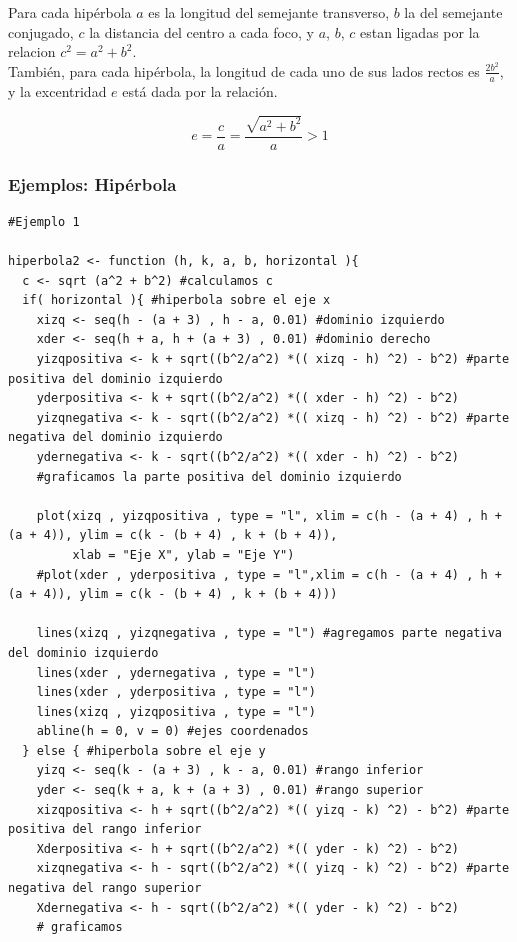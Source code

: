\documentclass[12pt,a4paper]{article} %
\begin{document}
Para cada hipérbola $a$ es la longitud del semejante transverso, $b$ la del semejante conjugado, $c$ la distancia del centro a cada foco, y $a$, $b$, $c$ estan ligadas por la relacion $c^2 = a^2 + b^2$.
\\También, para cada hipérbola, la longitud de cada uno de sus lados rectos es $\frac{2b^2}{a}$, y la excentridad $e$ está dada por la relación.

$$e = \frac{c}{a} = \frac{\sqrt{a^2 + b^2}}{a} > 1$$

\newpage

\subsubsection{Ejemplos: Hipérbola}

\begin{table}[htpb]
	\begin{lstlisting}
#Ejemplo 1

hiperbola2 <- function (h, k, a, b, horizontal ){
  c <- sqrt (a^2 + b^2) #calculamos c
  if( horizontal ){ #hiperbola sobre el eje x
    xizq <- seq(h - (a + 3) , h - a, 0.01) #dominio izquierdo
    xder <- seq(h + a, h + (a + 3) , 0.01) #dominio derecho
    yizqpositiva <- k + sqrt((b^2/a^2) *(( xizq - h) ^2) - b^2) #parte positiva del dominio izquierdo
    yderpositiva <- k + sqrt((b^2/a^2) *(( xder - h) ^2) - b^2)
    yizqnegativa <- k - sqrt((b^2/a^2) *(( xizq - h) ^2) - b^2) #parte negativa del dominio izquierdo
    ydernegativa <- k - sqrt((b^2/a^2) *(( xder - h) ^2) - b^2)
    #graficamos la parte positiva del dominio izquierdo
    
    plot(xizq , yizqpositiva , type = "l", xlim = c(h - (a + 4) , h + (a + 4)), ylim = c(k - (b + 4) , k + (b + 4)),
         xlab = "Eje X", ylab = "Eje Y")
    #plot(xder , yderpositiva , type = "l",xlim = c(h - (a + 4) , h + (a + 4)), ylim = c(k - (b + 4) , k + (b + 4)))
    
    lines(xizq , yizqnegativa , type = "l") #agregamos parte negativa del dominio izquierdo
    lines(xder , ydernegativa , type = "l")
    lines(xder , yderpositiva , type = "l")
    lines(xizq , yizqpositiva , type = "l")
    abline(h = 0, v = 0) #ejes coordenados
  } else { #hiperbola sobre el eje y
    yizq <- seq(k - (a + 3) , k - a, 0.01) #rango inferior
    yder <- seq(k + a, k + (a + 3) , 0.01) #rango superior
    xizqpositiva <- h + sqrt((b^2/a^2) *(( yizq - k) ^2) - b^2) #parte positiva del rango inferior
    Xderpositiva <- h + sqrt((b^2/a^2) *(( yder - k) ^2) - b^2) 
    xizqnegativa <- h - sqrt((b^2/a^2) *(( yizq - k) ^2) - b^2) #parte negativa del rango superior
    Xdernegativa <- h - sqrt((b^2/a^2) *(( yder - k) ^2) - b^2)
    # graficamos
    

\end{lstlisting}
\end{table}
\end{document}

